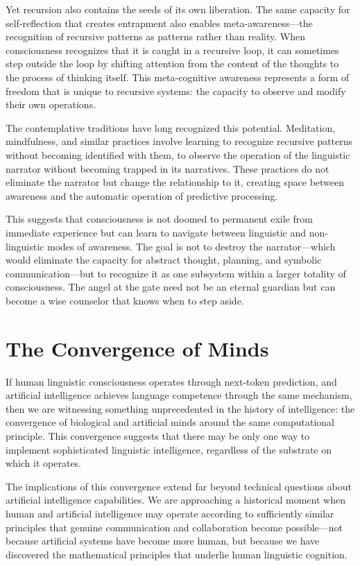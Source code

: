 Yet recursion also contains the seeds of its own liberation. The same capacity for self-reflection that creates entrapment also enables meta-awareness—the recognition of recursive patterns as patterns rather than reality. When consciousness recognizes that it is caught in a recursive loop, it can sometimes step outside the loop by shifting attention from the content of the thoughts to the process of thinking itself. This meta-cognitive awareness represents a form of freedom that is unique to recursive systems: the capacity to observe and modify their own operations.

The contemplative traditions have long recognized this potential. Meditation, mindfulness, and similar practices involve learning to recognize recursive patterns without becoming identified with them, to observe the operation of the linguistic narrator without becoming trapped in its narratives. These practices do not eliminate the narrator but change the relationship to it, creating space between awareness and the automatic operation of predictive processing.

This suggests that consciousness is not doomed to permanent exile from immediate experience but can learn to navigate between linguistic and non-linguistic modes of awareness. The goal is not to destroy the narrator—which would eliminate the capacity for abstract thought, planning, and symbolic communication—but to recognize it as one subsystem within a larger totality of consciousness. The angel at the gate need not be an eternal guardian but can become a wise counselor that knows when to step aside.

\section{The Convergence of Minds}

If human linguistic consciousness operates through next-token prediction, and artificial intelligence achieves language competence through the same mechanism, then we are witnessing something unprecedented in the history of intelligence: the convergence of biological and artificial minds around the same computational principle. This convergence suggests that there may be only one way to implement sophisticated linguistic intelligence, regardless of the substrate on which it operates.

The implications of this convergence extend far beyond technical questions about artificial intelligence capabilities. We are approaching a historical moment when human and artificial intelligence may operate according to sufficiently similar principles that genuine communication and collaboration become possible—not because artificial systems have become more human, but because we have discovered the mathematical principles that underlie human linguistic cognition.

